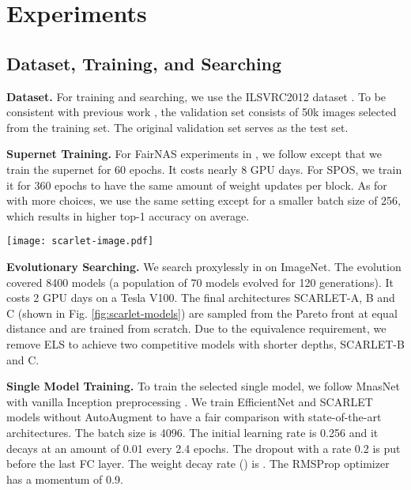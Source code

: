 \documentclass[10pt,twocolumn,letterpaper]{article}
\theoremstyle{definition}
\begin{document}
\section{Experiments}
\subsection{Dataset, Training, and Searching}
\textbf{Dataset.} For training and searching, we use the ILSVRC2012 dataset \cite{deng2009imagenet}. To be consistent with previous work \cite{tan2018mnasnet}, the validation set consists of 50k images selected from the training set. The original validation set serves as the test set. 

\textbf{Supernet Training.} For FairNAS experiments in , we follow \cite{chu2019fairnas} except that we train the supernet for 60 epochs. It costs nearly 8 GPU days. For SPOS, we train it for 360 epochs to have the same amount of weight updates per block. As for  with more choices, we use the same setting except for a smaller batch size of 256, which results in higher top-1 accuracy on average. 


\begin{figure*}[ht]
	\centering
	\texttt{[image: scarlet-image.pdf]}
\caption{The architectures of SCARLET-A, B and C (from top to bottom). Downsampling points are indicated by dashed lines. The stem and tail parts are omitted for brevity.}
	\label{fig:scarlet-models}
\end{figure*}

\textbf{Evolutionary Searching.} We search proxylessly in  on ImageNet. The evolution covered 8400 models (a population of 70 models evolved for 120 generations). It costs 2 GPU days on a Tesla V100. The final architectures SCARLET-A, B and C (shown in Fig. \ref{fig:scarlet-models}) are sampled from the Pareto front at equal distance and are trained from scratch. Due to the equivalence requirement, we remove ELS to achieve two competitive models with shorter depths, SCARLET-B and C. 

\textbf{Single Model Training.} To train the selected single model,  we follow MnasNet \cite{tan2018mnasnet} with vanilla Inception preprocessing \cite{szegedy2017inception}. We train EfficientNet and SCARLET models without AutoAugment \cite{cubuk2018autoaugment} to have a fair comparison with state-of-the-art architectures. The batch size is 4096. The initial learning rate is 0.256 and it decays at an amount of 0.01 every 2.4 epochs. The dropout with a rate 0.2 \cite{srivastava2014dropout} is put before the last FC layer. The weight decay rate () is . The RMSProp optimizer has a momentum of 0.9.
\end{document}
